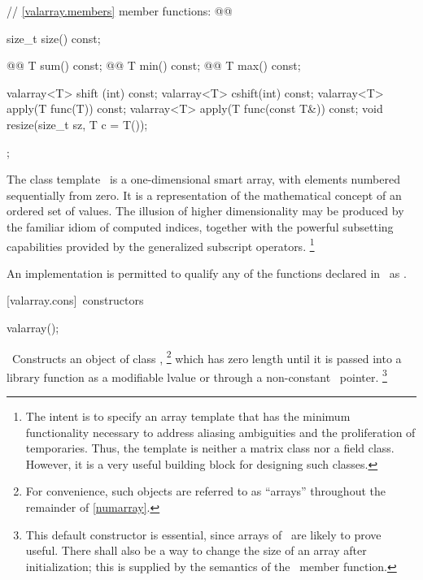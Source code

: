 \documentclass[american,twoside]{book}
\begin{document}
\begin{paras}
\begin{codeblock}
{{    // \ref{valarray.members} member functions:
    @@

    size_t size() const;

    @@      T    sum() const;
    @@ T    min() const;
    @@ T    max() const;

    valarray<T> shift (int) const;
    valarray<T> cshift(int) const;
    valarray<T> apply(T func(T)) const;
    valarray<T> apply(T func(const T&)) const;
    void resize(size_t sz, T c = T());
  };
}
\end{codeblock}

\pnum
The
class template
\
is a
one-dimensional smart array, with elements numbered sequentially from zero.
It is a representation of the mathematical concept
of an ordered set of values.
The illusion of higher dimensionality
may be produced by the familiar idiom of computed indices, together
with the powerful subsetting capabilities provided
by the generalized subscript operators.%
\footnote{
The intent is to specify an array template that has the minimum functionality
necessary to address aliasing ambiguities and the proliferation of
temporaries.
Thus, the
template is neither a
matrix class nor a field class.
However, it is a very useful building block for designing such classes.
}

\pnum
An implementation is permitted to qualify any of the functions declared in
\tcode{<valarray>}\
as
.

[valarray.cons]{\ constructors}

%
\begin{itemdecl}
valarray();
\end{itemdecl}

\begin{itemdescr}
\pnum
\effects\ 
Constructs an object of class
,%
\footnote{
For convenience, such objects are referred to as ``arrays'' throughout the
remainder of \ref{numarray}.
}
which has zero length until it is passed into a library function as a
modifiable lvalue or through a non-constant
\
pointer.%
\footnote{
This default constructor is essential,
since arrays of
\
are likely to prove useful.
There shall also be a way to change the size of an array after
initialization; this is supplied by the semantics of the
\tcode{resize}\
member function.
}
\end{itemdescr}


\end{paras}
\end{document}
